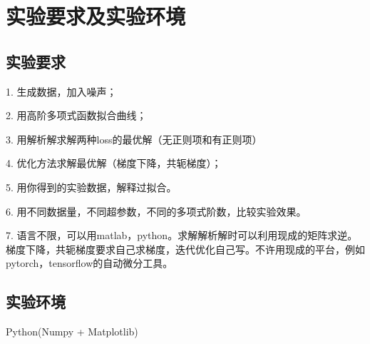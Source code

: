 \section{实验要求及实验环境}

\subsection{实验要求}

1. 生成数据，加入噪声；

2. 用高阶多项式函数拟合曲线；

3. 用解析解求解两种loss的最优解（无正则项和有正则项）

4. 优化方法求解最优解（梯度下降，共轭梯度）；

5. 用你得到的实验数据，解释过拟合。

6. 用不同数据量，不同超参数，不同的多项式阶数，比较实验效果。

7. 语言不限，可以用matlab，python。求解解析解时可以利用现成的矩阵求逆。梯度下降，共轭梯度要求自己求梯度，迭代优化自己写。不许用现成的平台，例如pytorch，tensorflow的自动微分工具。

\subsection{实验环境}

Python(Numpy + Matplotlib)
